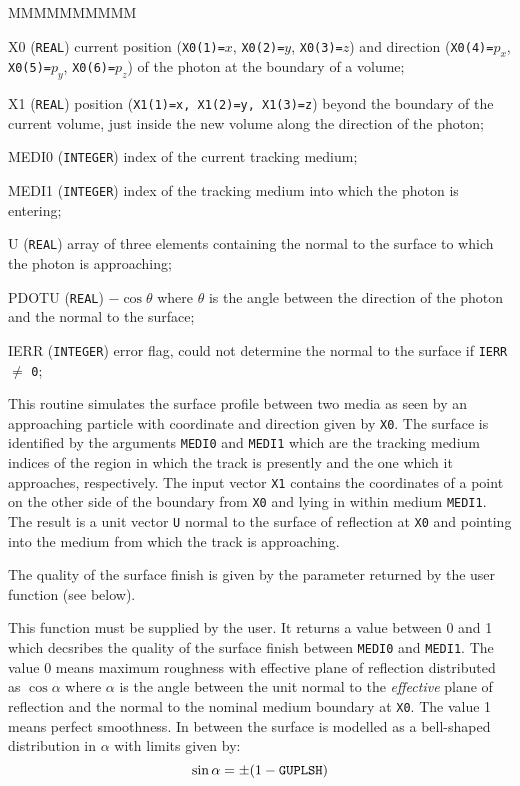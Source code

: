 \begin{DLtt}{MMMMMMMMMM}
\item[X0] ({\tt REAL}) current position ({\tt X0(1)=$x$},
{\tt X0(2)=$y$}, {\tt X0(3)=$z$})
and direction ({\tt X0(4)=$p_{x}$}, {\tt X0(5)=$p_{y}$},
{\tt X0(6)=$p_{z}$})
of the photon at the boundary of a volume;
\item[X1] ({\tt REAL}) position ({\tt X1(1)=x, X1(2)=y, X1(3)=z})
beyond the boundary of the current volume,
just inside the new volume along the direction of the photon;
\item[MEDI0] ({\tt INTEGER}) index of the current tracking medium;
\item[MEDI1] ({\tt INTEGER}) index of the tracking medium into which the
photon is entering;
\item[U] ({\tt REAL}) array of three elements containing the normal to
the surface to which the photon is approaching;
\item[PDOTU] ({\tt REAL}) $-\cos \theta$ where $\theta$ is the angle between
the direction of the photon and the normal to the surface;
\item[IERR] ({\tt INTEGER}) error flag,  could not determine
the normal to the surface if {\tt IERR} $\neq$ {\tt 0};
\end{DLtt}

This routine simulates the surface profile between two media as seen by
an approaching particle with coordinate and direction given by {\tt X0}.
The surface is identified by the arguments {\tt MEDI0} and {\tt MEDI1}
which are the tracking medium indices of the region in which the track
is presently and the one which it approaches, respectively. The input
vector {\tt X1} contains the coordinates of a point on the other side of
the boundary from {\tt X0} and lying in within medium {\tt MEDI1}. The
result is a unit vector {\tt U} normal to the surface of reflection at
{\tt X0} and pointing into the medium from which the track is approaching.

The quality of the surface finish is given by the parameter returned by
the user function  (see below).


This function must be supplied by the user. It returns a value between 0
and 1 which decsribes the quality of the surface finish between {\tt MEDI0}
and {\tt MEDI1}. The value 0 means maximum roughness with effective plane of
reflection distributed as $\cos \alpha$ where $\alpha$ is the angle
between the unit normal to the {\it effective} plane of reflection and
the normal to the nominal medium boundary at {\tt X0}. The value 1 means
perfect smoothness. In between the surface is modelled as a bell-shaped
distribution in $\alpha$ with limits given by:
\[
\sin \alpha = \pm (1-\mbox{\tt GUPLSH})
\]

